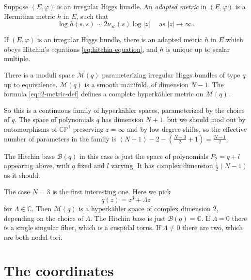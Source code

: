 \documentclass[12pt,letterpaper,reqno]{article}
\numberwithin{equation}{section}
\begin{document}
\begin{defn}
Suppose $(E,\varphi)$ is an irregular Higgs bundle. An \textit{adapted metric} in $(E,\varphi)$ is a Hermitian metric $h$ in $E$, such that
\begin{equation}
\log h(s,s) \sim 2 \nu_\infty(s) \log \lvert z \rvert \quad \text{ as } \lvert z \rvert \to \infty \, . 
\end{equation}
\end{defn}

\begin{thm}
If $(E,\varphi)$ is an irregular Higgs bundle, there is an adapted metric $h$ in $E$ which obeys Hitchin's equations \eqref{eq:hitchin-equation}, and $h$ is unique up to scalar multiple.
\end{thm}

\begin{thm}
There is a moduli space $\mathcal M(q)$ parameterizing irregular Higgs bundles of type $q$ up to equivalence.
$\mathcal M(q)$ is a smooth manifold, of dimension $N-1$.
The formula \eqref{eq:l2-metric-def} defines a complete hyperk\"ahler metric on $\mathcal M(q)$.
\end{thm}

So this is a continuous family of hyperk\"ahler spaces, parameterized by the choice of $q$.
The space of polynomials $q$ has dimension $N+1$, but we should mod out by automorphisms
of $\mathbb C\mathbb P^1$ preserving $z = \infty$ and by low-degree shifts,
so the effective number of parameters in the family 
is $(N+1) - 2 - (\frac{N-3}{2} + 1) = \frac{N-1}{2}$.

The Hitchin base $\mathcal B(q)$ in this case is just the space of polynomials 
$P_2 = q + l$ appearing above, with $q$ fixed and $l$ varying.
It has complex dimension $\frac12(N-1)$ as it should.

\begin{example}
The case $N=3$ is the first interesting one. Here we pick
\begin{equation}
  q(z) = z^3 + \Lambda z
\end{equation}
for $\Lambda \in \mathbb C$. Then $\mathcal M(q)$ is a hyperk\"ahler space of complex dimension $2$,
depending on the choice of $\Lambda$. The Hitchin base is just $\mathcal B(q) = \mathbb C$.
If $\Lambda = 0$ there is a single singular fiber, which is a cuspidal torus.
If $\Lambda \neq 0$ there are two, which are both nodal tori.
\end{example}

\section{The coordinates} \label{sec:coordinates}
\end{document}
